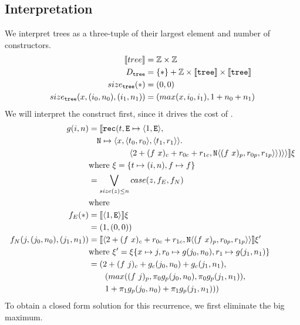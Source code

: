 \subsection{Interpretation}
%
We interpret trees as a three-tuple of their largest element and number of
 constructors.
%
\begin{align*}
  \llbracket tree \rrbracket &= \mathbb{Z} \times \mathbb{Z} \\
  D_{\texttt{tree}} &= \{\ast\} + \mathbb{Z} \times \llbracket \texttt{tree} \rrbracket \times \llbracket \texttt{tree} \rrbracket \\
  size_{\texttt{tree}}(\ast) &= (0, 0) \\
  size_{\texttt{tree}}(x, (i_0, n_0), (i_1, n_1)) &= (max(x, i_0, i_1), 1 + n_0 + n_1)
\end{align*}
%
We will interpret the  construct first, since it drives the cost of
.
%
\begin{align*}
  g(i,n) &= \LB\T{rec}(t, \T{E} \mapsto \LP 1,\T{E}\RP, \\
         &\quad \T{N} \mapsto \LP x,\LP t_0,r_0\RP,\LP t_1,r_1\RP\RP. \\
         &\quadfive \LP 2 + (f\ x)_c + r_{0c} + r_{1c}, \T{N}\LP (f\ x)_p,r_{0p},r_{1p}\RP\RP)\RP\RP\RB \xi\\
         &\text{where } \xi = \{t \mapsto (i,n), f \mapsto f \} \\
         &= \bigvee\limits_{size(z) \leq n} case(z, f_E, f_N) \\
         &\text{where} \\
  f_E(\ast) &= \LB \LP 1,\T{E}\RP\RB\xi  \\
            &= (1,(0,0)) \\
  f_N(j,(j_0, n_0),(j_1,n_1)) &= \LB \LP 2 + (f\ x)_c + r_{0c} + r_{1c}, \T{N}\LP (f\ x)_p,r_{0p},r_{1p}\RP\RP \RB \xi' \\
         &\text{where } \xi' = \xi \{ x \mapsto j, r_0 \mapsto g(j_0,n_0), r_1 \mapsto g(j_1,n_1) \} \\
         &= (2 + (f\ j)_c + g_c(j_0,n_0) + g_c(j_1,n_1), \\
         &\qquad (max((f\ j)_p, \pi_0g_p(j_0,n_0), \pi_0g_p(j_1,n_1)), \\
         &\qquad 1 + \pi_1g_p(j_0,n_0) + \pi_1g_p(j_1,n_1)))
\end{align*}
%
To obtain a closed form solution for this recurrence, we first eliminate the
big maximum.
%
